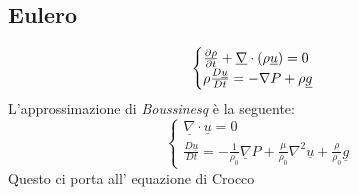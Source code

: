 \subsection*{Eulero}
\[
  \begin{cases}
    \frac{\partial\rho }{\partial t} + \underline{\nabla}\cdot \left( \rho \underline{u}\right) =0\\
    \rho \frac{D \underline{u}}{Dt}=-\nabla P + \rho \underline{g}
  \end{cases}
\]
L'approssimazione di \emph{Boussinesq} è la seguente:
\begin{equation}
  \begin{cases}
    \underline{\nabla}\cdot \underline{u}=0\\
    \frac{D \underline{u}}{Dt} =-\frac{1}{\rho_0}\underline{\nabla}P + \frac{\mu}{\rho_0}\nabla^2 \underline{u}+\frac{\rho}{\rho_0}\underline{g}
  \end{cases}
\end{equation}
Questo ci porta all' equazione di Crocco
